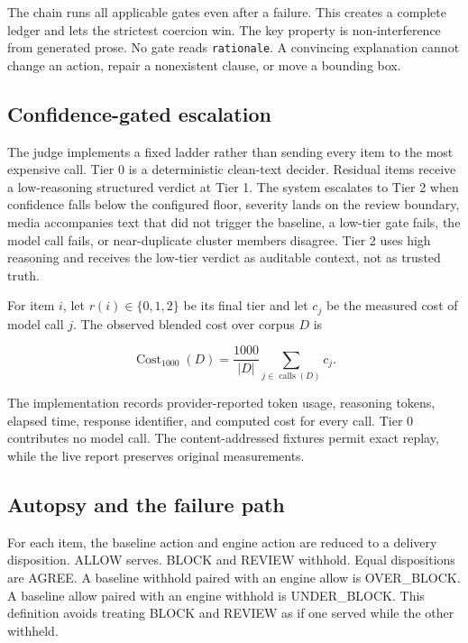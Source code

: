 \documentclass{article}
\newcommand{\code}[1]{\texttt{#1}}
\begin{document}
The chain runs all applicable gates even after a failure. This creates a complete ledger and lets the
strictest coercion win. The key property is non-interference from generated prose. No gate reads
\code{rationale}. A convincing explanation cannot change an action, repair a nonexistent clause, or
move a bounding box.

\subsection{Confidence-gated escalation}

The judge implements a fixed ladder rather than sending every item to the most expensive call.
Tier 0 is a deterministic clean-text decider. Residual items receive a low-reasoning structured
verdict at Tier 1. The system escalates to Tier 2 when confidence falls below the configured floor,
severity lands on the review boundary, media accompanies text that did not trigger the baseline, a
low-tier gate fails, the model call fails, or near-duplicate cluster members disagree. Tier 2 uses
high reasoning and receives the low-tier verdict as auditable context, not as trusted truth.

For item $i$, let $r(i) \in \{0,1,2\}$ be its final tier and let $c_j$ be the measured cost of model
call $j$. The observed blended cost over corpus $D$ is

\begin{equation}
\operatorname{Cost}_{1000}(D)
= \frac{1000}{|D|}\sum_{j \in \operatorname{calls}(D)} c_j.
\label{eq:cost}
\end{equation}

The implementation records provider-reported token usage, reasoning tokens, elapsed time, response
identifier, and computed cost for every call. Tier 0 contributes no model call. The content-addressed
fixtures permit exact replay, while the live report preserves original measurements.

\subsection{Autopsy and the failure path}

For each item, the baseline action and engine action are reduced to a delivery disposition. ALLOW
serves. BLOCK and REVIEW withhold. Equal dispositions are AGREE. A baseline withhold paired with an
engine allow is OVER\_BLOCK. A baseline allow paired with an engine withhold is UNDER\_BLOCK. This
definition avoids treating BLOCK and REVIEW as if one served while the other withheld.
\end{document}
